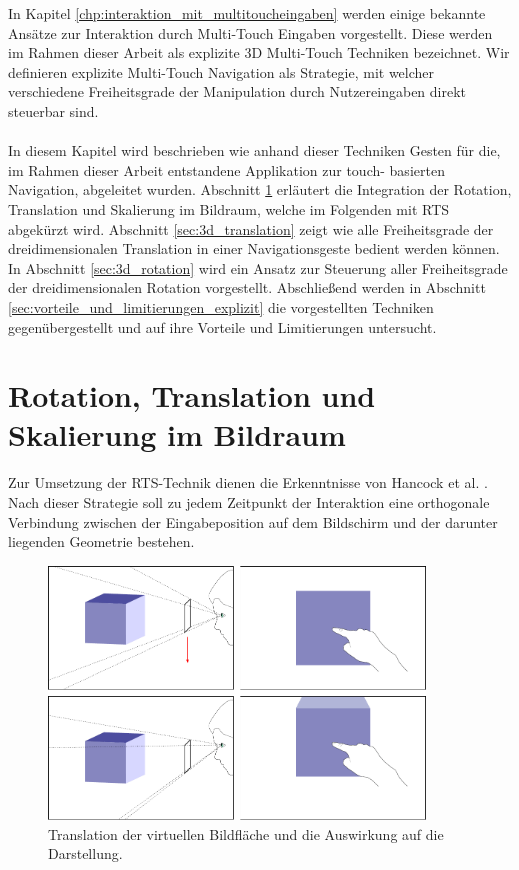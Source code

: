 In Kapitel \ref{chp:interaktion_mit_multitoucheingaben} werden einige bekannte Ansätze zur Interaktion durch Multi-Touch Eingaben vorgestellt. Diese werden im Rahmen dieser Arbeit als explizite 3D Multi-Touch Techniken bezeichnet. Wir definieren explizite Multi-Touch Navigation als Strategie, mit welcher verschiedene Freiheitsgrade der Manipulation durch Nutzereingaben direkt steuerbar sind.
\\\\
In diesem Kapitel wird beschrieben wie anhand dieser Techniken Gesten für die, im Rahmen dieser  Arbeit entstandene Applikation zur touch- basierten Navigation, abgeleitet wurden. Abschnitt \ref{sec:rst_im_bildraum} erläutert die Integration der Rotation, Translation und Skalierung im Bildraum, welche im Folgenden mit RTS abgekürzt wird. Abschnitt \ref{sec:3d_translation} zeigt wie alle Freiheitsgrade der dreidimensionalen Translation in einer Navigationsgeste bedient werden können. In Abschnitt \ref{sec:3d_rotation} wird ein Ansatz zur Steuerung aller Freiheitsgrade der dreidimensionalen Rotation vorgestellt. Abschließend werden in Abschnitt \ref{sec:vorteile_und_limitierungen_explizit} die vorgestellten Techniken gegenübergestellt und auf ihre Vorteile und Limitierungen untersucht.


\section{Rotation, Translation und Skalierung im Bildraum}
\label{sec:rst_im_bildraum}

Zur Umsetzung der RTS-Technik dienen die Erkenntnisse von Hancock et al. \cite{hancock:2007,hancock:2009}. Nach dieser Strategie soll zu jedem Zeitpunkt der Interaktion eine orthogonale Verbindung zwischen der Eingabeposition auf dem Bildschirm und der darunter liegenden Geometrie bestehen.

\begin{figure}
	\begin{center}
		\includegraphics[width=10cm]{img/screen-transformation.pdf}
	\end{center}
	\caption{Translation der virtuellen Bildfläche und die Auswirkung auf die Darstellung.}
	\label{fig:screen-transformation}
\end{figure}

